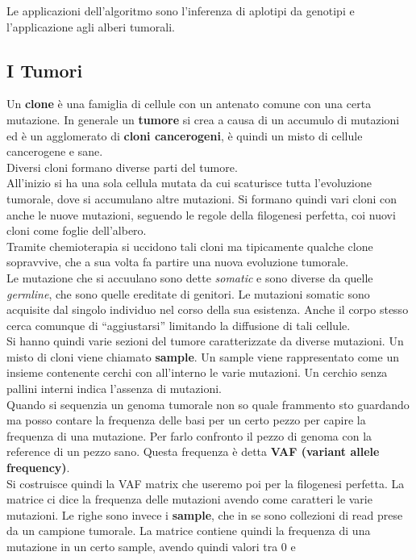 \documentclass[a4paper,12pt, oneside]{book}
\begin{document}
Le applicazioni dell'algoritmo sono l'inferenza di aplotipi da genotipi e
l'applicazione agli alberi tumorali.
\subsection{I Tumori}
Un \textbf{clone} è una famiglia di cellule con un antenato comune con una certa
mutazione. 
In generale un \textbf{tumore} si crea a causa di un accumulo di mutazioni ed è
un agglomerato di \textbf{cloni cancerogeni}, è quindi un misto di cellule
cancerogene e sane.\\
Diversi cloni formano diverse parti del tumore. \\
All'inizio si ha una sola cellula mutata da cui scaturisce tutta l'evoluzione
tumorale, dove si accumulano altre mutazioni. Si formano quindi vari cloni con
anche le nuove mutazioni, seguendo le regole della filogenesi perfetta, coi
nuovi cloni come foglie dell'albero.\\
Tramite chemioterapia si uccidono tali cloni ma tipicamente qualche clone
sopravvive, che a sua volta fa partire una nuova evoluzione tumorale.\\
Le mutazione che si accuulano sono dette \textit{somatic} e sono diverse da
quelle \textit{germline}, che sono quelle ereditate di genitori. Le mutazioni
somatic sono acquisite dal singolo individuo nel corso della sua
esistenza. Anche il corpo stesso cerca comunque di ``aggiustarsi'' limitando la
diffusione di tali cellule.\\
Si hanno quindi varie sezioni del tumore caratterizzate da diverse mutazioni. Un
misto di cloni viene chiamato \textbf{sample}. Un sample viene rappresentato
come un insieme contenente cerchi con all'interno le varie mutazioni. Un cerchio
senza pallini interni indica l'assenza di mutazioni.\\
Quando si sequenzia un genoma tumorale non so quale frammento sto guardando ma
posso contare la frequenza delle basi per un certo pezzo per capire la frequenza
di una mutazione. Per farlo confronto il pezzo di genoma con la reference di un
pezzo sano. Questa frequenza è detta \textbf{VAF (variant allele frequency)}.\\
Si costruisce quindi la VAF matrix che useremo poi per la filogenesi
perfetta. La matrice ci dice la frequenza delle mutazioni avendo come caratteri
le varie mutazioni. Le righe sono invece i \textbf{sample}, che in se sono
collezioni di read prese da un campione tumorale. La matrice contiene quindi la
frequenza di una mutazione in un certo sample, avendo quindi valori tra 0 e
\end{document}
